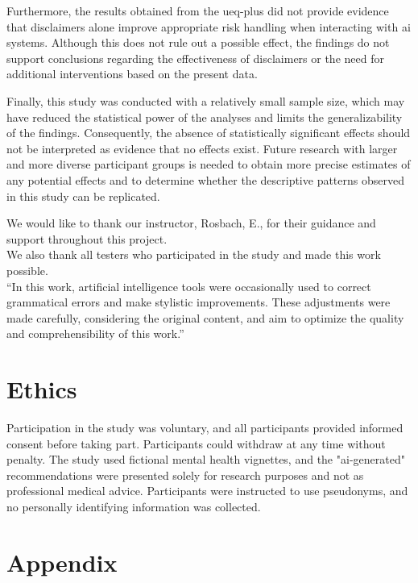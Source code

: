 \documentclass[sigconf,natbib=false]{acmart}
\begin{document}
Furthermore, the results obtained from the \gls{ueq-plus} did not provide evidence that disclaimers alone improve appropriate risk handling when interacting with \Gls{ai} systems. Although this does not rule out a possible effect, the findings do not support conclusions regarding the effectiveness of disclaimers or the need for additional interventions based on the present data.

Finally, this study was conducted with a relatively small sample size, which may have reduced the statistical power of the analyses and limits the generalizability of the findings. Consequently, the absence of statistically significant effects should not be interpreted as evidence that no effects exist. Future research with larger and more diverse participant groups is needed to obtain more precise estimates of any potential effects and to determine whether the descriptive patterns observed in this study can be replicated.




\begin{sloppypar}
\printbibliography
\end{sloppypar}


\begin{acks}
We would like to thank our instructor, Rosbach, E., for their guidance and support throughout this project.\\
We also thank all testers who participated in the study and made this work possible.\\
\enquote{In this work, artificial intelligence tools were occasionally used to correct grammatical errors and make stylistic improvements.
These adjustments were made carefully, considering the original content, and aim to optimize the quality and comprehensibility of this work.}\autocite[slide 54]{ai-usage-disclaimer}
\end{acks}



\section*{Ethics}

Participation in the study was voluntary, and all participants provided informed consent before taking part. Participants could withdraw at any time without penalty. The study used fictional mental health vignettes, and the "\acrshort{ai}-generated" recommendations were presented solely for research purposes and not as professional medical advice. Participants were instructed to use pseudonyms, and no personally identifying information was collected.


\onecolumn

\appendix
\section*{Appendix}





\clearpage
\listoffigures
\listoftables
\glsaddall
\printglossary[type=\acronymtype]

\printglossary
\clearpage

\tableofcontents
\end{document}
